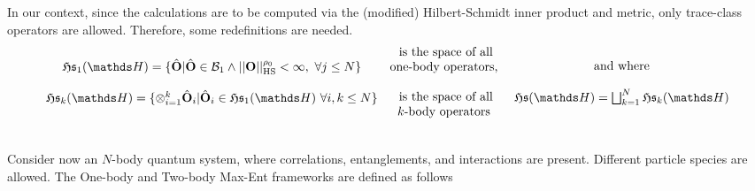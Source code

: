 \documentclass{homework}
\begin{document}
In our context, since the calculations are to be computed via the (modified) Hilbert-Schmidt inner product and metric, only trace-class operators are allowed. Therefore, some redefinitions are needed. 
\begin{equation}
    \begin{array}{c}
        \mathfrak{H}\mathfrak{s}_1(\hilbert)=\{\hat{\bf O} | \hat{\bf O} \in \mathcal{B}_1 \land ||{\bf O}||_{\textnormal{HS}}^{\rho_0} < \infty , \blanky \forall j \leq N \} \\
        \\
        \mathfrak{H}\mathfrak{s}_k(\hilbert)=\{\otimes_{i=1}^k \hat{\bf O}_i | \hat{\bf O}_i \in \mathfrak{H}\mathfrak{s}_1(\hilbert) \blanky \forall i,k \leq N \} 
    \end{array} \begin{array}{c}
         \textnormal{is the space of all} \\
         \textnormal{one-body operators, } \\
         \\
         \textnormal{is the space of all} \\
         \textnormal{$k$-body operators } 
    \end{array} \begin{array}{c}
         \textnormal{and where} \\ 
         \\
         \mathfrak{H}\mathfrak{s}(\hilbert) = \bigsqcup_{k=1}^N \mathfrak{H}\mathfrak{s}_k(\hilbert)
    \end{array}
\end{equation} 

\blanky \\ 

Consider now an $N$-body quantum system, where correlations, entanglements, and interactions are present. Different particle species are allowed. The One-body and Two-body Max-Ent frameworks are defined as follows
\end{document}
